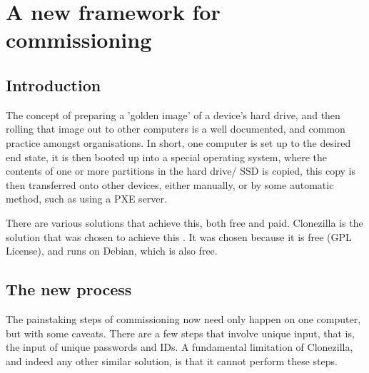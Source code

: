 \section{A new framework for commissioning}
    \subsection{Introduction}
    The concept of preparing a 'golden image' of a device's hard drive, and then rolling that image out to other computers is a well documented, and common practice amongst organisations. In short, one computer is set up to the desired end state, it is then booted up into a special operating system, where the contents of one or more partitions in the hard drive/ SSD is copied, this copy is then transferred onto other devices, either manually, or by some automatic method, such as using a PXE server.

    There are various solutions that achieve this, both free and paid. Clonezilla is the solution that was chosen to achieve this \cite{clonezilla}. It was chosen because it is free (GPL License), and runs on Debian, which is also free.
    \subsection{The new process}
    The painstaking steps of commissioning now need only happen on one computer, but with some caveats. There are a few steps that involve unique input, that is, the input of unique passwords and IDs. A fundamental limitation of Clonezilla, and indeed any other similar solution, is that it cannot perform these steps.